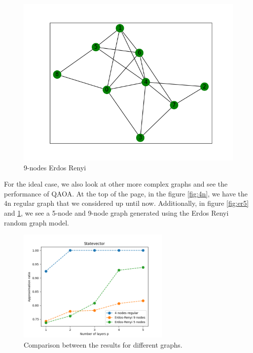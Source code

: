 \begin{figure}[h]
    \begin{minipage}{0.33\textwidth}
        \centering
        \includegraphics[width=\textwidth]{images/Erdos-Renyi graph.png}
        \caption{9-nodes Erdos Renyi}
        \label{fig:er9}
    \end{minipage}
\end{figure}

For the ideal case, we also look at other more complex graphs and see the performance of QAOA.
At the top of the page, in the figure \ref{fig:4n}, we have the 4n regular graph that we considered up until now. Additionally, in figure \ref{fig:er5} and \ref{fig:er9}, we see a 5-node and 9-node graph generated using the Erdos Renyi random graph model.
 \begin{figure}
    \centering
    \includegraphics[width=0.66\textwidth]{images/StateVector.png}
    \caption{Comparison between the results for different graphs.}
    \label{fig:statevector_graph}
\end{figure}


